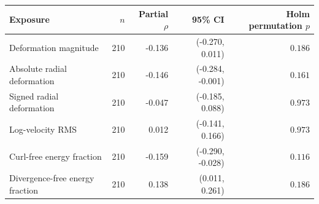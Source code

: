 \begin{tabular}{lrrrr}
\toprule
Exposure & $n$ & Partial $\rho$ & 95\% CI & Holm permutation $p$ \\
\midrule
Deformation magnitude & 210 & -0.136 & (-0.270, 0.011) & \(0.186\) \\
Absolute radial deformation & 210 & -0.146 & (-0.284, -0.001) & \(0.161\) \\
Signed radial deformation & 210 & -0.047 & (-0.185, 0.088) & \(0.973\) \\
Log-velocity RMS & 210 & 0.012 & (-0.141, 0.166) & \(0.973\) \\
Curl-free energy fraction & 210 & -0.159 & (-0.290, -0.028) & \(0.116\) \\
Divergence-free energy fraction & 210 & 0.138 & (0.011, 0.261) & \(0.186\) \\
\bottomrule
\end{tabular}

